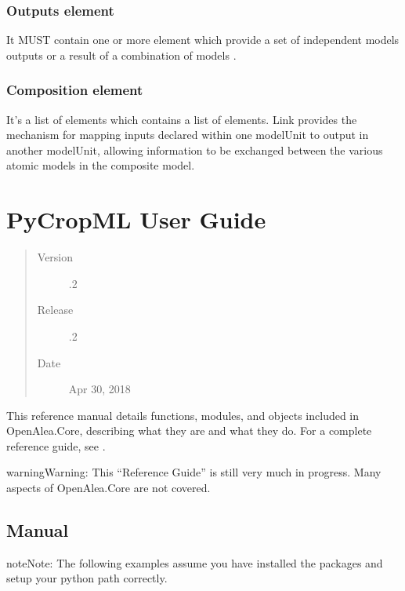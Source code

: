 \documentclass[letterpaper,10pt,english]{sphinxmanual}
\begin{document}
\subsubsection{Outputs element}
\label{\detokenize{user/description:id2}}
It MUST contain one or more  element which provide a set of independent models outputs or a result of a combination of models .


\subsubsection{Composition element}
\label{\detokenize{user/description:composition-element}}
It’s a list of  elements which contains a list of  elements.
Link provides the mechanism for mapping inputs declared within one modelUnit to output in another modelUnit,
allowing information to be exchanged between the various atomic models in the composite model.


\section{PyCropML User Guide}
\label{\detokenize{user/index:pycropml-user-guide}}\label{\detokenize{user/index:pycropml-user}}\label{\detokenize{user/index::doc}}\begin{quote}\begin{description}
\item[{Version}] .2

\item[{Release}] .2

\item[{Date}] \leavevmode
Apr 30, 2018

\end{description}\end{quote}

This reference manual details functions, modules, and objects included in
OpenAlea.Core, describing what they are and what they do. For a complete
reference guide, see .

\begin{sphinxadmonition}{warning}{Warning:}
This “Reference Guide” is still very much in progress.
Many aspects of OpenAlea.Core are not covered.
\end{sphinxadmonition}


\subsection{Manual}
\label{\detokenize{user/manual:manual}}\label{\detokenize{user/manual::doc}}
\begin{sphinxadmonition}{note}{Note:}
The following examples assume you have installed the packages and setup your python path correctly.
\end{sphinxadmonition}
\end{document}
